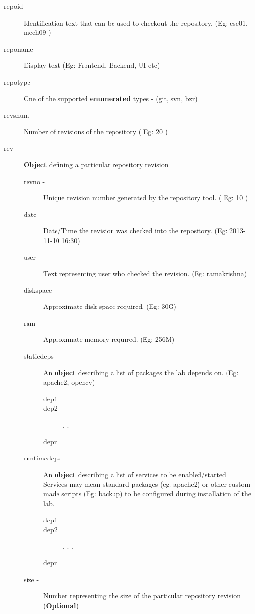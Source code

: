 \documentclass[11pt]{article}
\begin{document}
\begin{description}
\begin{description}
\begin{description}
\begin{description}
\item [repoid -] Identification text that can be used to checkout the repository. (Eg: cse01, mech09 )
\item [reponame -] Display text (Eg: Frontend, Backend, UI etc)
\item [repotype -] One of the supported \textbf{enumerated} types - (git, svn, bzr)
\item [revsnum -] Number of revisions of the repository ( Eg: 20 )
\item [rev -] \textbf{Object} defining a particular repository revision

\begin{description}
\item [revno -] Unique revision number generated by the repository tool. ( Eg: 10 )
\item [date -] Date/Time the revision was checked into the repository. (Eg: 2013-11-10 16:30)
\item [user -] Text representing user who checked the revision. (Eg: ramakrishna)
\item [diskspace -] Approximate disk-space required. (Eg: 30G)
\item [ram -] Approximate memory required. (Eg: 256M)
\item [staticdeps -] An \textbf{object} describing a list of packages the lab depends on. (Eg: apache2, opencv)

\begin{description}
\item [dep1]
\item [dep2]
                      .
                      .
\item [depn]
\end{description}

\item [runtimedeps -] An \textbf{object} describing a list of services to be enabled/started. Services may mean
                                standard packages (eg. apache2) or other custom made scripts (Eg: backup)
                                to be configured during installation of the lab.

\begin{description}
\item [dep1]
\item [dep2]
                      .
                      .
                      .
\item [depn]
\end{description}

\item [size -] Number representing the size of the particular repository revision (\textbf{Optional})
\end{description}

\end{description}

\end{description}

\end{description}

\end{description}
\end{document}
